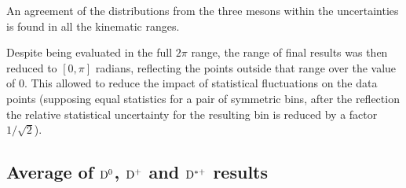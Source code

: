 An agreement of the distributions from the three mesons within the uncertainties is found in all the kinematic ranges.

Despite being evaluated in the full $2\pi$ range, the range of final results was then reduced to $[0,\pi]$ radians, reflecting the points outside that range over the value of 0. This allowed to reduce the impact of statistical fluctuations on the data points (supposing equal statistics for a pair of symmetric bins, after the reflection the relative statistical uncertainty for the resulting bin is reduced by a factor $1/\sqrt{2}$).




\subsection{Average of ${\rm D^0}$, ${\rm D^+}$ and ${\rm D^{*+}}$ results}

